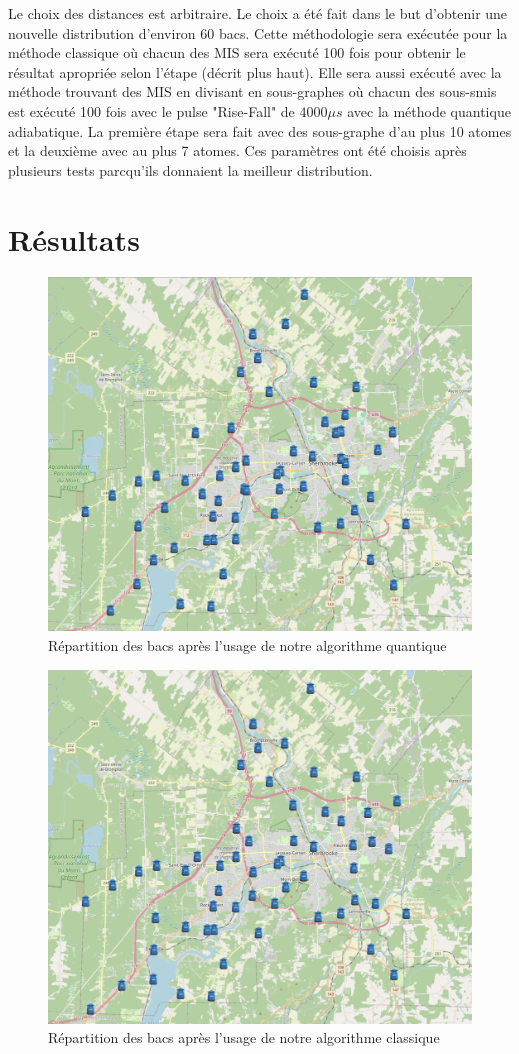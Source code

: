 \documentclass[11pt]{article}
\begin{document}
Le choix des distances est arbitraire. Le choix a été fait dans le but d'obtenir une nouvelle distribution d'environ 60 bacs.
Cette méthodologie sera exécutée pour la méthode classique où chacun des MIS sera exécuté 100 fois pour obtenir le résultat apropriée selon l'étape (décrit plus haut).
Elle sera aussi exécuté avec la méthode trouvant des MIS en divisant en sous-graphes où chacun des sous-smis est exécuté 100 fois avec le pulse  "Rise-Fall" de $4000 \mu s$ avec la méthode quantique adiabatique. La première étape sera fait avec des sous-graphe d'au plus 10 atomes et la deuxième avec au plus 7 atomes. Ces paramètres ont été choisis après plusieurs tests parcqu'ils donnaient la meilleur distribution.



\section{Résultats}
\begin{figure}[H]
    \centering
    \includegraphics[width=0.49\linewidth]{images/new_quantum.png}
    \caption{Répartition des bacs après l'usage de notre algorithme quantique}
    \label{new_quantum}
\end{figure}
\begin{figure}[H]
    \centering
    \includegraphics[width=0.49\linewidth]{images/new_classical.png}
    \caption{Répartition des bacs après l'usage de notre algorithme classique}
    \label{new_classical}
\end{figure}
\end{document}
